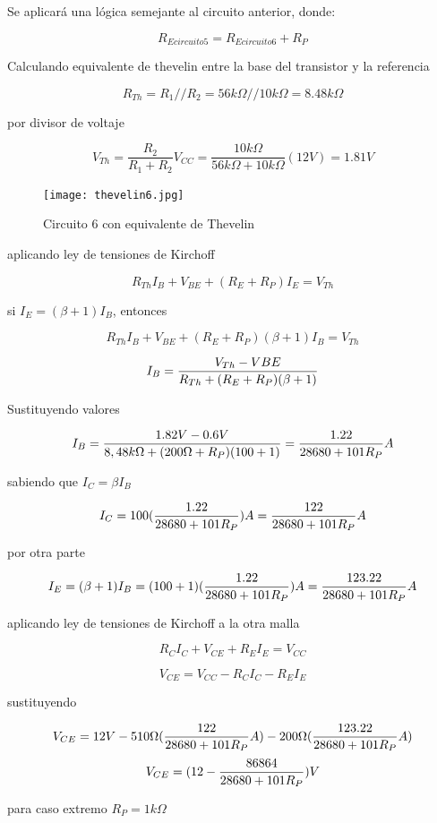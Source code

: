 \documentclass[10pt, a4paper]{article}
\begin{document}
    Se aplicará una lógica semejante al circuito anterior, donde:

    $$R_{Ecircuito5} = R_{Ecircuito6} + R_P$$

    Calculando equivalente de thevelin entre la base del transistor y la referencia

    $$R_{Th} = R_1 // R_2 = 56k\Omega // 10k\Omega = 8.48k\Omega$$
    
    por divisor de voltaje

    $$V_{Th} = \frac{R_2}{R_1 + R_2} V_{CC} = \frac{10k\Omega}{56k\Omega + 10k\Omega} (12V) = 1.81V$$

    \begin{figure}[h!]
        \centering
        \texttt{[image: thevelin6.jpg]} \par
        \caption{\label{fig:14} Circuito 6 con equivalente de Thevelin}
    \end{figure}

    aplicando ley de tensiones de Kirchoff

    $$R_{Th}I_B + V_{BE} + (R_E + R_P)I_E = V_{Th}$$

    si $I_E = (\beta + 1)I_B$, entonces

    $$R_{Th}I_B + V_{BE} + (R_E + R_P)(\beta + 1)I_B = V_{Th}$$

    $$I_B = {V_{Th} - V{BE} \over R_{Th} + (R_E + R_P)(\beta + 1)}$$

    Sustituyendo valores

    $$I_B = {1.82V - 0.6V \over 8,48k\Omega + (200\Omega + R_P)(100 + 1)} = {1.22 \over 28680 +101R_P} A$$

    sabiendo que $I_C = \beta I_B$

    $$I_C = 100({1.22 \over 28680 +101R_P})A = {122 \over 28680 +101R_P}A$$

    por otra parte

    $$I_E = (\beta + 1)I_B = (100 + 1)({1.22 \over 28680 +101R_P})A = {123.22 \over 28680 +101R_P}A$$

    aplicando ley de tensiones de Kirchoff a la otra malla

    $$R_{C}I_C + V_{CE} + R_EI_E = V_{CC}$$

    $$V_{CE} = V_{CC} - R_{C}I_C - R_EI_E$$

    sustituyendo

    $$V_{CE} = 12V - 510\Omega ({122 \over 28680 +101R_P}A) - 200\Omega ({123.22 \over 28680 +101R_P}A)$$
    $$V_{CE} = (12 - {86864 \over 28680 +101R_P})V$$

    para caso extremo $R_P = 1k\Omega$
\end{document}
